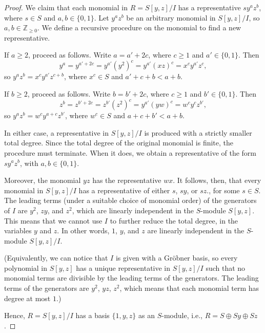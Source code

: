 \documentclass[12pt]{article}
\newcommand{\Z}{\mathbb{Z}}
\newcommand{\<}{\langle}
\renewcommand{\>}{\rangle}
\begin{document}
\begin{proof}
    We claim that each monomial in $R = S[y, z]/I$ has a representative $sy^az^b$, where $s \in S$ and $a, b \in \{0, 1\}$. Let $y^az^b$ be an arbitrary monomial in $S[y, z]/I$, so $a, b \in \Z_{\geq 0}$. We define a recursive procedure on the monomial to find a new representative.
    
    If $a \geq 2$, proceed as follows. Write $a = a' + 2c$, where $c \geq 1$ and $a' \in \{0, 1\}$. Then
    \[
        y^a
            = y^{a' + 2c}
            = y^{a'}(y^2)^c
            = y^{a'}(xz)^c
            = x^cy^{a'}z^c,
    \]
    so $y^az^b = x^cy^{a'}z^{c + b}$, where $x^c \in S$ and $a' + c + b < a + b$.

    If $b \geq 2$, proceed as follows. Write $b = b' + 2c$, where $c \geq 1$ and $b' \in \{0, 1\}$. Then
    \[
        z^b
            = z^{b' + 2c}
            = z^{b'}(z^2)^c
            = y^{a'}(yw)^c
            = w^cy^cz^{b'},
    \]
    so $y^az^b = w^cy^{a + c}z^{b'}$, where $w^c \in S$ and $a + c + b' < a + b$.

    In either case, a representative in $S[y, z]/I$ is produced with a strictly smaller total degree. Since the total degree of the original monomial is finite, the procedure must terminate. When it does, we obtain a representative of the form $sy^az^b$, with $a, b \in \{0, 1\}$.
    
    Moreover, the monomial $yz$ has the representative $wx$. It follows, then, that every monomial in $S[y, z]/I$ has a representative of either $s$, $sy$, or $sz$., for some $s \in S$. The leading terms (under a suitable choice of monomial order) of the generators of $I$ are $y^2$, $zy$, and $z^2$, which are linearly independent in the $S$-module $S[y, z]$. This means that we cannot use $I$ to further reduce the total degree, in the variables $y$ and $z$. In other words, $1$, $y$, and $z$ are linearly independent in the $S$-module $S[y, z]/I$.

    (Equivalently, we can notice that $I$ is given with a Gr\"obner basis, so every polynomial in $S[y, z]$ has a unique representative in $S[y, z]/I$ such that no monomial terms are divisible by the leading terms of the generators. The leading terms of the generators are $y^2$, $yz$, $z^2$, which means that each monomial term has degree at most $1$.)

    Hence, $R = S[y, z]/I$ has a basis $\{1, y, z\}$ as an $S$-module, i.e., $R = S \oplus Sy \oplus Sz$.

\end{proof}
\end{document}
